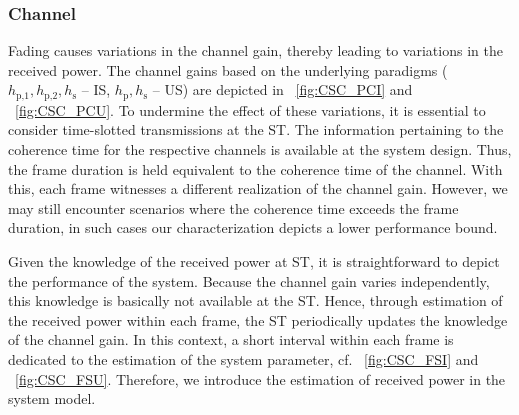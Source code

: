 \documentclass[draftcls, onecolumn, 11pt]{IEEEtran}
\newcommand{\sub}[1]{_{\text{#1}}}
\newcommand{\hp}{h\sub{p}}
\newcommand{\hpo}{h\sub{p,1}}
\newcommand{\hpt}{h\sub{p,2}}
\newcommand{\hs}{h\sub{s}}
\begin{document}
\subsubsection*{Channel}

Fading causes variations in the channel gain, thereby leading to variations in the received power. The channel gains based on the underlying paradigms ($\hpo, \hpt, \hs$ -- IS, $\hp, \hs$ -- US) are depicted in \figurename~\ref{fig:CSC_PCI} and \figurename~\ref{fig:CSC_PCU}. %
To undermine the effect of these variations, it is essential to consider time-slotted transmissions at the ST. 
The information pertaining to the coherence time for the respective channels is available at the system design. 
Thus, the frame duration is held equivalent to the coherence time of the channel. 
With this, each frame witnesses a different realization of the channel gain. 
However, we may still encounter scenarios where the coherence time exceeds the frame duration, in such cases our characterization depicts a lower performance bound. %

Given the knowledge of the received power at ST, it is straightforward to depict the performance of the system. Because the channel gain varies independently, this knowledge is basically not available at the ST. Hence, through estimation of the received power within each frame, the ST periodically updates the knowledge of the channel gain. In this context, a short interval within each frame is dedicated to the estimation of the system parameter, cf. \figurename~\ref{fig:CSC_FSI} and \figurename~\ref{fig:CSC_FSU}. Therefore, we introduce the estimation of received power in the system model. 
\end{document}
